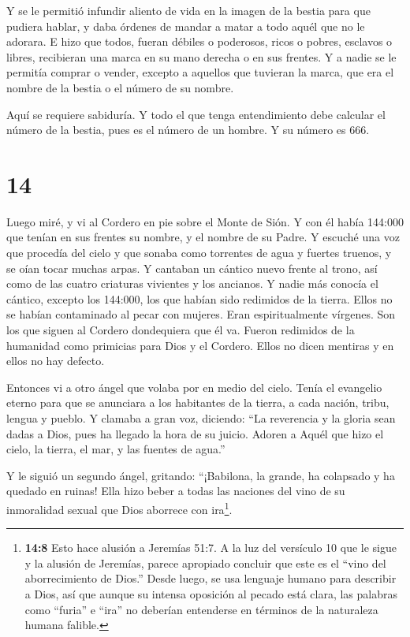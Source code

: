  Y se le permitió infundir aliento de vida en la imagen de
la bestia para que pudiera hablar, y daba órdenes de mandar a matar a
todo aquél que no le adorara.  E hizo que todos, fueran
débiles o poderosos, ricos o pobres, esclavos o libres, recibieran una
marca en su mano derecha o en sus frentes.  Y a nadie se le
permitía comprar o vender, excepto a aquellos que tuvieran la marca, que
era el nombre de la bestia o el número de su nombre.

 Aquí se requiere sabiduría. Y todo el que tenga
entendimiento debe calcular el número de la bestia, pues es el número de
un hombre. Y su número es 666.

\hypertarget{section-13}{%
\section{14}\label{section-13}}

 Luego miré, y vi al Cordero en pie sobre el Monte de Sión.
Y con él había 144:000 que tenían en sus frentes su nombre, y el nombre
de su Padre.  Y escuché una voz que procedía del cielo y que
sonaba como torrentes de agua y fuertes truenos, y se oían tocar muchas
arpas.  Y cantaban un cántico nuevo frente al trono, así
como de las cuatro criaturas vivientes y los ancianos. Y nadie más
conocía el cántico, excepto los 144:000, los que habían sido redimidos
de la tierra.  Ellos no se habían contaminado al pecar con
mujeres. Eran espiritualmente vírgenes. Son los que siguen al Cordero
dondequiera que él va. Fueron redimidos de la humanidad como primicias
para Dios y el Cordero.  Ellos no dicen mentiras y en ellos
no hay defecto.

 Entonces vi a otro ángel que volaba por en medio del cielo.
Tenía el evangelio eterno para que se anunciara a los habitantes de la
tierra, a cada nación, tribu, lengua y pueblo.  Y clamaba a
gran voz, diciendo: ``La reverencia y la gloria sean dadas a Dios, pues
ha llegado la hora de su juicio. Adoren a Aquél que hizo el cielo, la
tierra, el mar, y las fuentes de agua.''

 Y le siguió un segundo ángel, gritando: ``¡Babilona, la
grande, ha colapsado y ha quedado en ruinas! Ella hizo beber a todas las
naciones del vino de su inmoralidad sexual que Dios aborrece con
ira\footnote{\textbf{14:8} Esto hace alusión a Jeremías 51:7. A la luz
  del versículo 10 que le sigue y la alusión de Jeremías, parece
  apropiado concluir que este es el ``vino del aborrecimiento de Dios.''
  Desde luego, se usa lenguaje humano para describir a Dios, así que
  aunque su intensa oposición al pecado está clara, las palabras como
  ``furia'' e ``ira'' no deberían entenderse en términos de la
  naturaleza humana falible.}.

